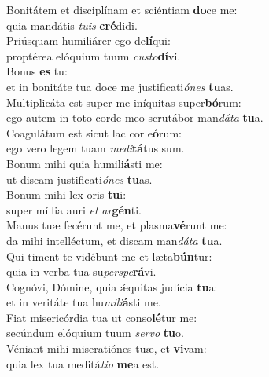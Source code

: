 \evenverse Bonitátem et disciplínam et sciéntiam \textbf{do}ce me:~\*\\
\evenverse quia mandátis \textit{tu}\textit{is} \textbf{cré}didi.\\
\oddverse Priúsquam humiliárer ego de\textbf{lí}qui:~\*\\
\oddverse proptérea elóquium tuum \textit{cu}\textit{sto}\textbf{dí}vi.\\
\evenverse Bonus \textbf{es} tu:~\*\\
\evenverse et in bonitáte tua doce me justificati\textit{ó}\textit{nes} \textbf{tu}as.\\
\oddverse Multiplicáta est super me iníquitas super\textbf{bó}rum:~\*\\
\oddverse ego autem in toto corde meo scrutábor man\textit{dá}\textit{ta} \textbf{tu}a.\\
\evenverse Coagulátum est sicut lac cor e\textbf{ó}rum:~\*\\
\evenverse ego vero legem tuam \textit{me}\textit{di}\textbf{tá}tus sum.\\
\oddverse Bonum mihi quia humili\textbf{á}sti me:~\*\\
\oddverse ut discam justificati\textit{ó}\textit{nes} \textbf{tu}as.\\
\evenverse Bonum mihi lex oris \textbf{tu}i:~\*\\
\evenverse super míllia auri \textit{et} \textit{ar}\textbf{gén}ti.\\
\oddverse Manus tuæ fecérunt me, et plasma\textbf{vé}runt me:~\*\\
\oddverse da mihi intelléctum, et discam man\textit{dá}\textit{ta} \textbf{tu}a.\\
\evenverse Qui timent te vidébunt me et læta\textbf{bún}tur:~\*\\
\evenverse quia in verba tua su\textit{per}\textit{spe}\textbf{rá}vi.\\
\oddverse Cognóvi, Dómine, quia ǽquitas judícia \textbf{tu}a:~\*\\
\oddverse et in veritáte tua hu\textit{mi}\textit{li}\textbf{á}sti me.\\
\evenverse Fiat misericórdia tua ut conso\textbf{lé}tur me:~\*\\
\evenverse secúndum elóquium tuum \textit{ser}\textit{vo} \textbf{tu}o.\\
\oddverse Véniant mihi miseratiónes tuæ, et \textbf{vi}vam:~\*\\
\oddverse quia lex tua meditá\textit{ti}\textit{o} \textbf{me}a est.\\
